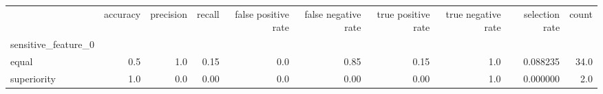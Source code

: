 \begin{tabular}{lrrrrrrrrr}
\toprule
{} &  accuracy &  precision &  recall &  false positive rate &  false negative rate &  true positive rate &  true negative rate &  selection rate &  count \\
sensitive\_feature\_0 &           &            &         &                      &                      &                     &                     &                 &        \\
\midrule
equal               &       0.5 &        1.0 &    0.15 &                  0.0 &                 0.85 &                0.15 &                 1.0 &        0.088235 &   34.0 \\
superiority         &       1.0 &        0.0 &    0.00 &                  0.0 &                 0.00 &                0.00 &                 1.0 &        0.000000 &    2.0 \\
\bottomrule
\end{tabular}
